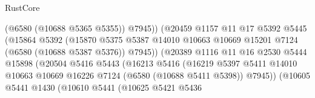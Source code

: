 \begin{lexlean}{RustCore}
\begin{coremodule}
                                          (@6580 (@10688 @5365 @5355))
                                          @7945))
                                      (@20459
                                        @1157
                                        @11
                                        @17
                                        @5392
                                        @5445
                                        (@15864
                                          @5392
                                          (@15870
                                            @5375
                                            @5387
                                            @14010
                                            @10663
                                            @10669
                                            @15201
                                            @7124
                                            (@6580 (@10688 @5387 @5376))
                                            @7945))
                                        (@20389
                                          @1116
                                          @11
                                          @16
                                          @2530
                                          @5444
                                          @15898
                                          (@20504
                                            @5416
                                            @5443
                                            (@16213
                                              @5416
                                              (@16219
                                                @5397
                                                @5411
                                                @14010
                                                @10663
                                                @10669
                                                @16226
                                                @7124
                                                (@6580 (@10688 @5411 @5398))
                                                @7945))
                                            (@10605
                                              @5441
                                              @1430
                                              (@10610
                                                @5441
                                                (@10625
                                                  @5421
                                                  @5436

\end{coremodule}
\end{lexlean}
